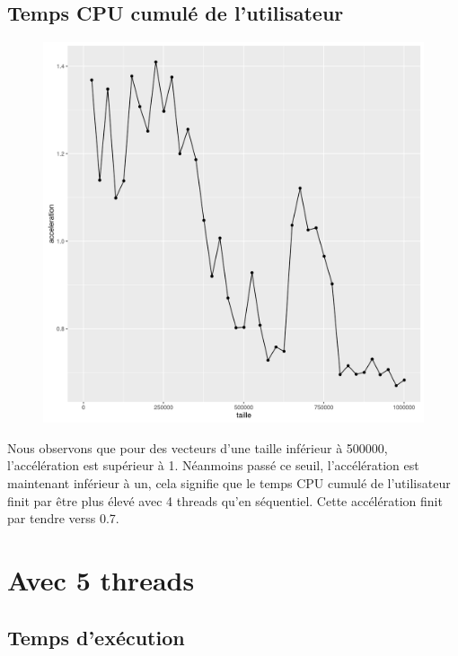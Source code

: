 \documentclass[a4paper,11pt]{scrartcl}
\begin{document}
\subsection{Temps CPU cumul\'e de l'utilisateur}
\begin{figure}[H] \center
   \includegraphics[scale=0.5] {graphes/temps_user_accel4.png}
\end{figure}
Nous observons que pour des vecteurs d'une taille inf\'erieur \`a 500000, l'acc\'el\'eration est sup\'erieur \`a 1. N\'eanmoins pass\'e ce seuil,  l'acc\'el\'eration est maintenant inf\'erieur \`a un, cela signifie que le temps CPU cumul\'e de l'utilisateur finit par \^{e}tre plus \'elev\'e avec 4 threads qu'en s\'equentiel. Cette acc\'el\'eration finit par tendre verss 0.7.


\section{Avec 5 threads}
\subsection{Temps d'ex\'ecution}
\end{document}
